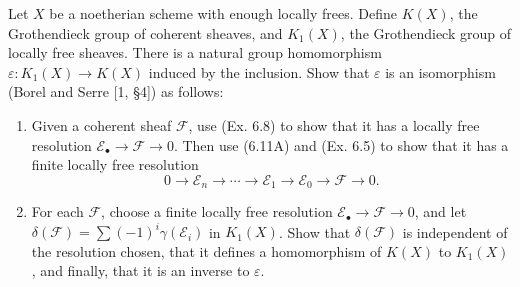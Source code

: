 Let $X$ be a noetherian scheme with enough locally frees. Define $K(X)$, the Grothendieck group of coherent sheaves, and $K_1(X)$, the Grothendieck group of locally free sheaves. There is a natural group homomorphism $\varepsilon: K_1(X) \to K(X)$ induced by the inclusion. Show that $\varepsilon$ is an isomorphism (Borel and Serre [1, \S4]) as follows:

\begin{enumerate}
\item[(a)] Given a coherent sheaf $\mathcal{F}$, use (Ex. 6.8) to show that it has a locally free resolution $\mathcal{E}_\bullet \to \mathcal{F} \to 0$. Then use (6.11A) and (Ex. 6.5) to show that it has a finite locally free resolution
$$0 \to \mathcal{E}_n \to \cdots \to \mathcal{E}_1 \to \mathcal{E}_0 \to \mathcal{F} \to 0.$$

\item[(b)] For each $\mathcal{F}$, choose a finite locally free resolution $\mathcal{E}_\bullet \to \mathcal{F} \to 0$, and let $\delta(\mathcal{F}) = \sum (-1)^i \gamma(\mathcal{E}_i)$ in $K_1(X)$. Show that $\delta(\mathcal{F})$ is independent of the resolution chosen, that it defines a homomorphism of $K(X)$ to $K_1(X)$, and finally, that it is an inverse to $\varepsilon$.
\end{enumerate}

